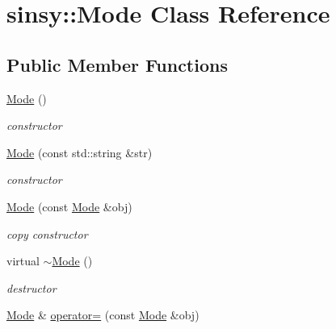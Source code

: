 \hypertarget{classsinsy_1_1Mode}{\section{sinsy\-:\-:\-Mode \-Class \-Reference}
\label{classsinsy_1_1Mode}
}
\subsection*{\-Public \-Member \-Functions}
\begin{DoxyCompactItemize}
\item 
\hypertarget{classsinsy_1_1Mode_a098246baedeee64fa0ed3b53547cf55f}{\hyperlink{classsinsy_1_1Mode_a098246baedeee64fa0ed3b53547cf55f}{\-Mode} ()}\label{classsinsy_1_1Mode_a098246baedeee64fa0ed3b53547cf55f}

\begin{DoxyCompactList}\small\item\em constructor \end{DoxyCompactList}\item 
\hyperlink{classsinsy_1_1Mode_a1b2d5d264bc2de44e9efc27b98fb482c}{\-Mode} (const std\-::string \&str)
\begin{DoxyCompactList}\small\item\em constructor \end{DoxyCompactList}\item 
\hypertarget{classsinsy_1_1Mode_ae7f0ff16a094082d2f9896c077fd6ddf}{\hyperlink{classsinsy_1_1Mode_ae7f0ff16a094082d2f9896c077fd6ddf}{\-Mode} (const \hyperlink{classsinsy_1_1Mode}{\-Mode} \&obj)}\label{classsinsy_1_1Mode_ae7f0ff16a094082d2f9896c077fd6ddf}

\begin{DoxyCompactList}\small\item\em copy constructor \end{DoxyCompactList}\item 
\hypertarget{classsinsy_1_1Mode_a6b8809388084822aeac00adbcbe107f7}{virtual \hyperlink{classsinsy_1_1Mode_a6b8809388084822aeac00adbcbe107f7}{$\sim$\-Mode} ()}\label{classsinsy_1_1Mode_a6b8809388084822aeac00adbcbe107f7}

\begin{DoxyCompactList}\small\item\em destructor \end{DoxyCompactList}\item 
\hypertarget{classsinsy_1_1Mode_ac8122253680690c29f4a48e01d7fef2a}{\hyperlink{classsinsy_1_1Mode}{\-Mode} \& \hyperlink{classsinsy_1_1Mode_ac8122253680690c29f4a48e01d7fef2a}{operator=} (const \hyperlink{classsinsy_1_1Mode}{\-Mode} \&obj)}\label{classsinsy_1_1Mode_ac8122253680690c29f4a48e01d7fef2a}


\end{DoxyCompactItemize}

